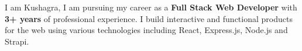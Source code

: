 
I am Kushagra, I am pursuing my career as a \textbf{Full Stack Web Developer} with \textbf{3+ years} of professional experience. I build interactive and functional products for the web using various technologies including React, Express.js, Node.js and Strapi.